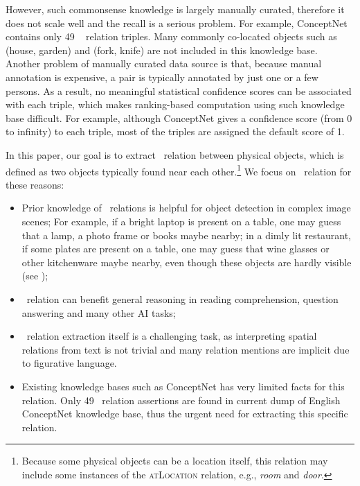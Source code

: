 However, such commonsense knowledge is largely manually curated, therefore it does not scale well and the recall is a serious problem.
For example, ConceptNet contains only 49 \lnear~
relation triples. 
Many commonly co-located objects such as (house, garden) and 
(fork, knife) are not included in this knowledge base. 
Another problem of manually curated data source is that, because manual
annotation is expensive, a pair is typically annotated by just one 
or a few persons. 
As a result, no meaningful statistical confidence scores can be
associated with each triple, which makes ranking-based 
computation using such knowledge base difficult. 
For example, although ConceptNet gives a confidence
score (from 0 to infinity) to each triple, most of the triples are assigned the default
score of 1.

In this paper, our goal is to extract \lnear\ relation between
physical objects, which is defined as two objects typically found near each
other.\footnote{Because some physical objects can be a location itself, this
relation may include some instances of the \textsc{atLocation} relation,
e.g., {\em room} and {\em door}.}
We focus on \lnear\ relation for these reasons:
\begin{itemize}
\item Prior knowledge of \lnear\ relations is helpful for object detection in complex image scenes; 
For example, if a bright laptop is present on a table, one may guess that a lamp, a photo frame or books maybe nearby; in a dimly lit restaurant, if some plates are present on a table,
one may guess that wine glasses or other kitchenware maybe nearby, 
even though these objects are hardly visible (see );
\item \lnear~relation can benefit general reasoning in reading comprehension, question answering and many other AI tasks;
\item \lnear~relation extraction itself is a challenging task, as interpreting spatial relations from text is not trivial and many relation mentions are implicit due to figurative language.
\item Existing knowledge bases such as ConceptNet has very limited facts for this relation. Only 49 \lnear~relation assertions are found in current dump of English ConceptNet knowledge base, thus the urgent need for extracting this specific relation.
\end{itemize}



